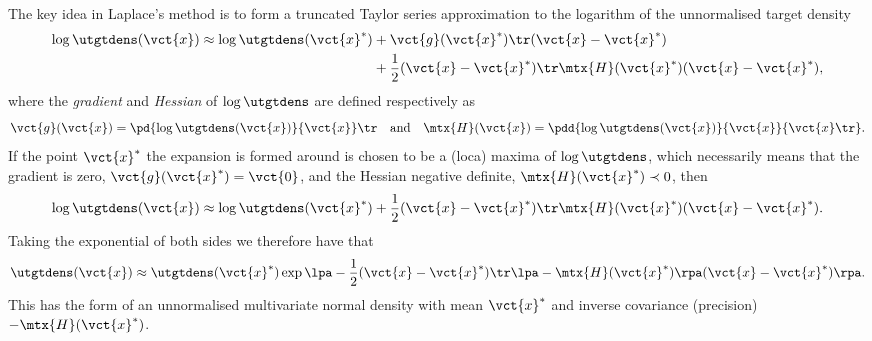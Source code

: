 The key idea in Laplace's method is to form a truncated Taylor series approximation to the logarithm of the unnormalised target density
\begin{equation}\label{eq:log-target-taylor-expansion}
\begin{split}
  \log\utgtdens(\vct{x}) \approx 
  \log\utgtdens(\vct{x}^*) 
  &+ \vct{g}(\vct{x}^*)\tr(\vct{x}-\vct{x}^*) \\
  &+ \frac{1}{2} (\vct{x}-\vct{x}^*)\tr \mtx{H}(\vct{x}^*)(\vct{x}-\vct{x}^*),\\
\end{split}
\end{equation}
where the \emph{gradient} and \emph{Hessian} of $\log\utgtdens$ are defined respectively as
\begin{equation}
  \vct{g}(\vct{x}) = \pd{\log\utgtdens(\vct{x})}{\vct{x}}\tr
  \quad\textrm{and}\quad
  \mtx{H}(\vct{x}) = \pdd{\log\utgtdens(\vct{x})}{\vct{x}}{\vct{x}\tr}.
\end{equation}
If the point $\vct{x}^*$ the expansion is formed around is chosen to be a (loca) maxima of $\log\utgtdens$, which necessarily means that the gradient is zero, $\vct{g}(\vct{x}^*) = \vct{0}$, and the Hessian negative definite, $\mtx{H}(\vct{x}^*) \prec 0$, then
\begin{equation}\label{eq:laplace-approximation-log}
  \log\utgtdens(\vct{x}) \approx
  \log\utgtdens(\vct{x}^*) + \frac{1}{2} (\vct{x}-\vct{x}^*)\tr \mtx{H}(\vct{x}^*)(\vct{x}-\vct{x}^*).
\end{equation}
Taking the exponential of both sides we therefore have that
\begin{equation}\label{eq:laplace-approximation-exp}
  \utgtdens(\vct{x}) \approx
  \utgtdens(\vct{x}^*) \exp\lpa-\frac{1}{2} (\vct{x}-\vct{x}^*)\tr \lpa -\mtx{H}(\vct{x}^*)\rpa(\vct{x}-\vct{x}^*)\rpa.
\end{equation}
This has the form of an unnormalised multivariate normal density with mean $\vct{x}^*$ and inverse covariance (precision) $-\mtx{H}(\vct{x}^*)$.

